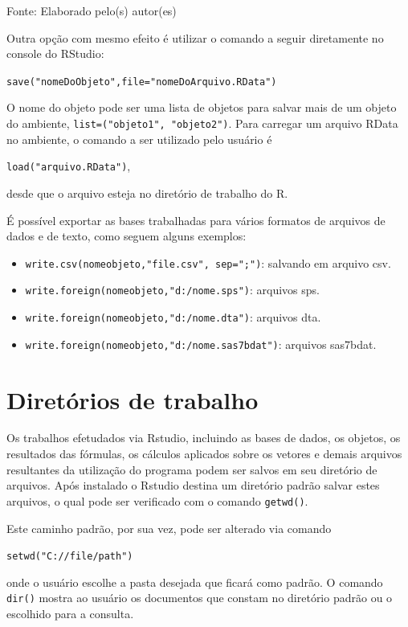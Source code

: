 \documentclass[12pt,brazil,oneside]{book}
\providecommand{\tightlist}{%
  \setlength{\itemsep}{0pt}\setlength{\parskip}{0pt}}
\begin{document}
Fonte: Elaborado pelo(s) autor(es)

Outra opção com mesmo efeito é utilizar o comando a seguir diretamente no console do RStudio:

\texttt{save("nomeDoObjeto",file="nomeDoArquivo.RData")}

O nome do objeto pode ser uma lista de objetos para salvar mais de um objeto do ambiente, \texttt{list=("objeto1",\ "objeto2")}. Para carregar um arquivo RData no ambiente, o comando a ser utilizado pelo usuário é

\texttt{load("arquivo.RData")},

desde que o arquivo esteja no diretório de trabalho do R.

É possível exportar as bases trabalhadas para vários formatos de arquivos de dados e de texto, como seguem alguns exemplos:

\begin{itemize}
\tightlist
\item
  \texttt{write.csv(nomeobjeto,"file.csv",\ sep=";")}: salvando em arquivo csv.
\item
  \texttt{write.foreign(nomeobjeto,"d:/nome.sps")}: arquivos sps.
\item
  \texttt{write.foreign(nomeobjeto,"d:/nome.dta")}: arquivos dta.
\item
  \texttt{write.foreign(nomeobjeto,"d:/nome.sas7bdat")}: arquivos sas7bdat.
\end{itemize}

\hypertarget{diretorios-de-trabalho}{%
\section{Diretórios de trabalho}\label{diretorios-de-trabalho}}

Os trabalhos efetudados via Rstudio, incluindo as bases de dados, os objetos, os resultados das fórmulas, os cálculos aplicados sobre os vetores e demais arquivos resultantes da utilização do programa podem ser salvos em seu diretório de arquivos. Após instalado o Rstudio destina um diretório padrão salvar estes arquivos, o qual pode ser verificado com o comando \texttt{getwd()}.

Este caminho padrão, por sua vez, pode ser alterado via comando

\texttt{setwd("C://file/path")}

onde o usuário escolhe a pasta desejada que ficará como padrão. O comando \texttt{dir()} mostra ao usuário os documentos que constam no diretório padrão ou o escolhido para a consulta.
\end{document}
